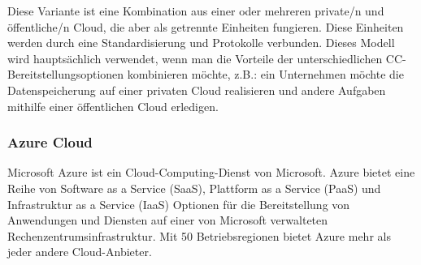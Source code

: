 Diese Variante ist eine Kombination aus einer oder mehreren private/n und öffentliche/n Cloud, die aber als getrennte Einheiten fungieren. Diese Einheiten werden durch eine Standardisierung und Protokolle verbunden. Dieses Modell wird hauptsächlich verwendet, wenn man die Vorteile der unterschiedlichen CC-Bereitstellungsoptionen kombinieren möchte, z.B.:  ein Unternehmen möchte die Datenspeicherung auf einer privaten Cloud realisieren und andere Aufgaben mithilfe einer öffentlichen Cloud erledigen.

\subsubsection{Azure Cloud}

Microsoft Azure ist ein Cloud-Computing-Dienst von Microsoft. Azure bietet eine Reihe von Software as a Service (SaaS), Plattform as a Service (PaaS) und Infrastruktur as a Service (IaaS) Optionen für die Bereitstellung von Anwendungen und Diensten auf einer von Microsoft verwalteten Rechenzentrumsinfrastruktur. Mit 50 Betriebsregionen bietet Azure mehr als jeder andere Cloud-Anbieter.

